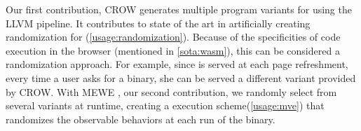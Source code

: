 

Our first contribution, CROW \cite{CROW} generates multiple program variants for \wasm using the LLVM pipeline.
It contributes to state of the art in artificially creating randomization for \wasm (\autoref{usage:randomization}). Because of the specificities of code execution in the browser (mentioned in \autoref{sota:wasm}), this can be considered a randomization approach. For example, since \wasm is served at each page refreshment, every time a user asks for a \wasm binary, she can be served a different variant provided by CROW. 
With MEWE \cite{MEWE}, our second contribution, we randomly select from several variants at runtime, creating a execution scheme(\autoref{usage:mve}) that randomizes the observable behaviors at each run of the binary. %

